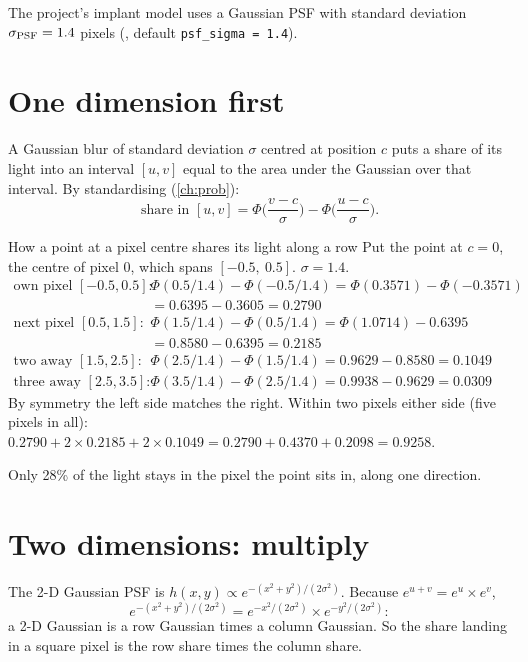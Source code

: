 \documentclass[11pt,a4paper,oneside,openany]{book}
\begin{document}
The project's implant model uses a Gaussian PSF with standard deviation $\sigma_{\rm PSF}=1.4$ pixels
(, default \texttt{psf\_sigma = 1.4}).

\section{One dimension first}

A Gaussian blur of standard deviation $\sigma$ centred at position $c$ puts a share of its light into an interval $[u,v]$ equal to the
area under the Gaussian over that interval. By standardising (\cref{ch:prob}):
\[
  \text{share in }[u,v]=\Phi\Big(\frac{v-c}{\sigma}\Big)-\Phi\Big(\frac{u-c}{\sigma}\Big).
\]

\begin{worked}[label=we:psf1d]{How a point at a pixel centre shares its light along a row}
Put the point at $c=0$, the centre of pixel 0, which spans $[-0.5,\ 0.5]$. $\sigma=1.4$.
\begin{align*}
\text{own pixel } [-0.5,0.5]: &\quad \Phi(0.5/1.4)-\Phi(-0.5/1.4)=\Phi(0.3571)-\Phi(-0.3571)\\
 &\quad =0.6395-0.3605=0.2790\\
\text{next pixel } [0.5,1.5]: &\quad \Phi(1.5/1.4)-\Phi(0.5/1.4)=\Phi(1.0714)-0.6395\\
 &\quad =0.8580-0.6395=0.2185\\
\text{two away } [1.5,2.5]: &\quad \Phi(2.5/1.4)-\Phi(1.5/1.4)=0.9629-0.8580=0.1049\\
\text{three away } [2.5,3.5]: &\quad \Phi(3.5/1.4)-\Phi(2.5/1.4)=0.9938-0.9629=0.0309
\end{align*}
By symmetry the left side matches the right. Within two pixels either side (five pixels in all):
$0.2790+2\times0.2185+2\times0.1049=0.2790+0.4370+0.2098=0.9258$.
\end{worked}

Only 28\% of the light stays in the pixel the point sits in, along one direction.

\section{Two dimensions: multiply}

The 2-D Gaussian PSF is $h(x,y)\propto e^{-(x^2+y^2)/(2\sigma^2)}$. Because $e^{u+v}=e^u\times e^v$,
\[
  e^{-(x^2+y^2)/(2\sigma^2)}=e^{-x^2/(2\sigma^2)}\times e^{-y^2/(2\sigma^2)} :
\]
a 2-D Gaussian is a row Gaussian times a column Gaussian. So the share landing in a square pixel is the row share times the column
share.
\end{document}
